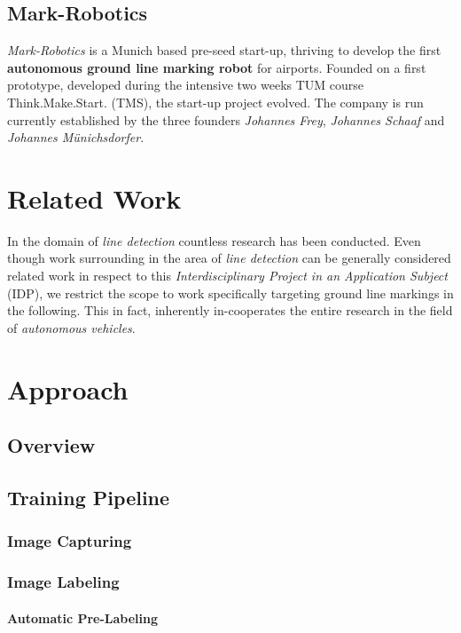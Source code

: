 \section{Mark-Robotics}
\label{sec:mark-robotics}

\emph{Mark-Robotics} is a Munich based pre-seed start-up, thriving to develop the first \textbf{autonomous ground line marking robot} for airports. Founded on a first prototype, developed during the intensive two weeks TUM course Think.Make.Start. (TMS), the start-up project evolved. The company is run currently established by the three founders \emph{Johannes Frey}, \emph{Johannes Schaaf} and \emph{Johannes Münichsdorfer}.

\chapter{Related Work}
\label{ch:related-work}

In the domain of \emph{line detection} countless research has been conducted. Even though work surrounding in the area of \emph{line detection} can be generally considered related work in respect to this \emph{Interdisciplinary Project in an Application Subject} (IDP), we restrict the scope to work specifically targeting ground line markings in the following. This in fact, inherently in-cooperates the entire research in the field of \emph{autonomous vehicles}.


\chapter{Approach}
\label{ch:approach}

\section{Overview}

\section{Training Pipeline}
\subsection{Image Capturing}
\subsection{Image Labeling}
\subsubsection{Automatic Pre-Labeling}
